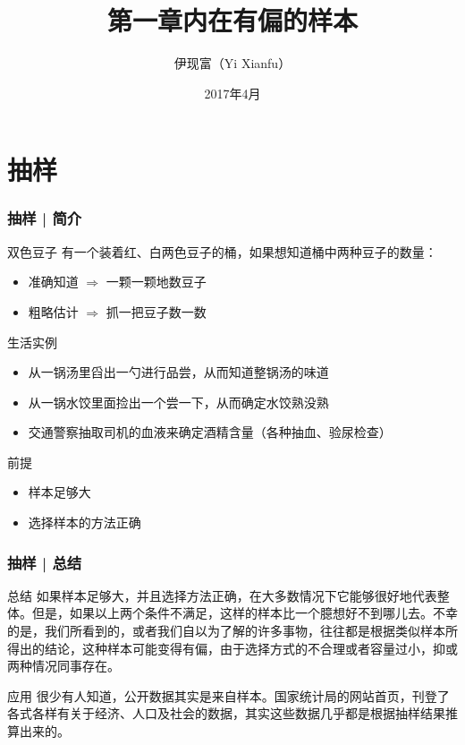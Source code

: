 



\title[抽样]{第一章\quad 内在有偏的样本}
\author[Yixf]{伊现富（Yi Xianfu）}
\date{2017年4月}



\section{抽样}
\begin{frame}
  \frametitle{抽样 | 简介}
  \begin{block}{双色豆子}
    有一个装着红、白两色豆子的桶，如果想知道桶中两种豆子的数量：
    \begin{itemize}
      \item 准确知道 $\Longrightarrow$ 一颗一颗地数豆子
      \item 粗略估计 $\Longrightarrow$ 抓一把豆子数一数
    \end{itemize}
  \end{block}
  \pause
  \begin{block}{生活实例}
    \begin{itemize}
      \item 从一锅汤里舀出一勺进行品尝，从而知道整锅汤的味道
      \item 从一锅水饺里面捡出一个尝一下，从而确定水饺熟没熟
      \item 交通警察抽取司机的血液来确定酒精含量（各种抽血、验尿检查）
    \end{itemize}
  \end{block}
  \pause
  \begin{block}{前提}
    \begin{itemize}
      \item 样本足够大
      \item 选择样本的方法正确
    \end{itemize}
  \end{block}
\end{frame}

\begin{frame}
  \frametitle{抽样 | 总结}
  \begin{block}{总结}
如果样本足够大，并且选择方法正确，在大多数情况下它能够很好地代表整体。但是，如果以上两个条件不满足，这样的样本比一个臆想好不到哪儿去。不幸的是，我们所看到的，或者我们自以为了解的许多事物，往往都是根据类似样本所得出的结论，这种样本可能变得有偏，由于选择方式的不合理或者容量过小，抑或两种情况同事存在。
  \end{block}
  \pause
  \begin{block}{应用}
很少有人知道，公开数据其实是来自样本。国家统计局的网站首页，刊登了各式各样有关于经济、人口及社会的数据，其实这些数据几乎都是根据抽样结果推算出来的。
  \end{block}
\end{frame}

